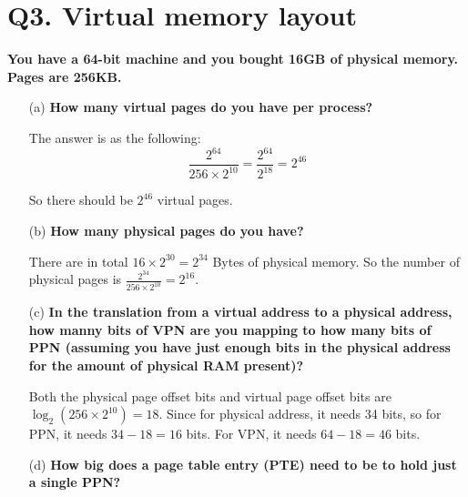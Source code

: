\documentclass{article}
\theoremstyle{remark}
\theoremstyle{definition}
\begin{document}
    \section{Q3. Virtual memory layout}
    \textbf{You have a 64-bit machine and you bought 16GB of physical memory. Pages are 256KB.}
    \begin{enumerate}
        \item[(a)] \textbf{How many virtual pages do you have per process?}

        The answer is as the following:
        \begin{equation*}
            \frac{2^{64}}{256\times 2^{10}} = \frac{2^{64}}{2^{18}} = 2^{46}
        \end{equation*}

        So there should be $2^{46}$ virtual pages.

        \item[(b)] \textbf{How many physical pages do you have?}

        There are in total $16\times 2^{30} = 2^{34}$ Bytes of physical memory. So the number of physical pages is $\frac{2^{34}}{256\times 2^{10}} = 2^{16}$.

        \item[(c)] \textbf{In the translation from a virtual address to a physical address, how manny bits of VPN are you mapping to how many bits of PPN (assuming you have just enough bits in the physical address for the amount of physical RAM present)?}

        Both the physical page offset bits and virtual page offset bits are $\log_2 \left( 256\times 2^{10} \right) = 18$. Since for physical address, it needs 34 bits, so for PPN, it needs $34 - 18 = 16$ bits. For VPN, it needs $64 - 18 = 46$ bits.

        \item[(d)] \textbf{How big does a page table entry (PTE) need to be to hold just a single PPN?}


    \end{enumerate}
\end{document}
